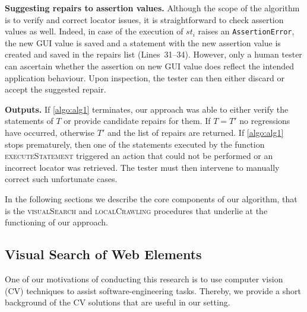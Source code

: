 \noindent
\textbf{Suggesting repairs to assertion values.}
Although the scope of the algorithm is to verify and correct locator issues, it is straightforward to check assertion values as well. Indeed, in case of the execution of $st_i$ raises an \texttt{AssertionError}, the new GUI value is saved and a statement with the new assertion value is created and saved in the repairs list (Lines~31--34). 
However, only a human tester can ascertain whether the assertion on new GUI value does reflect the intended application behaviour. Upon inspection, the tester can then either discard or accept the suggested repair.

\noindent
\textbf{Outputs.}
If \autoref{algo:alg1} terminates, our approach was able to either verify the statements of $T$ or provide candidate repairs for them. 
If $T = T'$ no regressions have occurred, otherwise $T'$ and the list of repairs are returned.
If \autoref{algo:alg1} stops prematurely, then one of the statements executed by the function \textsc{executeStatement} triggered an action that could not be performed or an incorrect locator was retrieved. The tester must then intervene to manually correct such unfortunate cases.

In the following sections we describe the core components of our algorithm, that is the \textsc{visualSearch} and \textsc{localCrawling} procedures that underlie at the functioning of our approach.

\subsection{Visual Search of Web Elements}\label{sec:vis}

One of our motivations of conducting this research is to use computer vision (CV) techniques to assist software-engineering tasks. 
Thereby, we provide a short background of the CV solutions that are useful in our setting.

